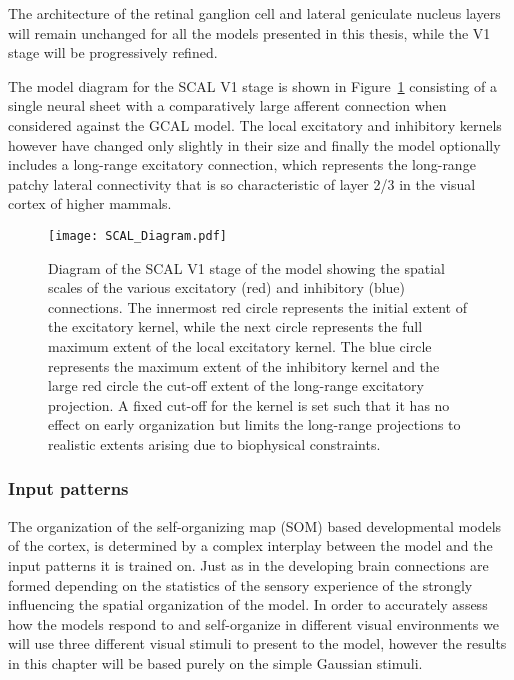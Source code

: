 The architecture of the retinal ganglion cell and lateral geniculate
nucleus layers will remain unchanged for all the models presented in
this thesis, while the V1 stage will be progressively refined.

The model diagram for the SCAL V1 stage is shown in
Figure~\ref{SCALDiagram} consisting of a single neural sheet with a
comparatively large afferent connection when considered against the
GCAL model. The local excitatory and inhibitory kernels however have
changed only slightly in their size and finally the model optionally
includes a long-range excitatory connection, which represents the
long-range patchy lateral connectivity that is so characteristic of
layer 2/3 in the visual cortex of higher mammals.

\begin{figure}
	\centering
        \texttt{[image: SCAL\_Diagram.pdf]}
	\caption[Schematic representation of the SCAL model.]{Diagram of
      the SCAL V1 stage of the model showing the spatial scales of the
      various excitatory (red) and inhibitory (blue) connections. The
      innermost red circle represents the initial extent of the
      excitatory kernel, while the next circle represents the full
      maximum extent of the local excitatory kernel. The blue circle
      represents the maximum extent of the inhibitory kernel and the
      large red circle the cut-off extent of the long-range excitatory
      projection. A fixed cut-off for the kernel is set such that it
      has no effect on early organization but limits the long-range
      projections to realistic extents arising due to biophysical
      constraints.}
	\label{SCALDiagram}
\end{figure}

\subsubsection*{Input patterns}

The organization of the self-organizing map (SOM) based developmental
models of the cortex, is determined by a complex interplay between the
model and the input patterns it is trained on. Just as in the
developing brain connections are formed depending on the statistics of
the sensory experience of the strongly influencing the spatial
organization of the model. In order to accurately assess how the
models respond to and self-organize in different visual environments
we will use three different visual stimuli to present to the model,
however the results in this chapter will be based purely on the simple
Gaussian stimuli.

